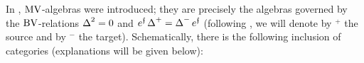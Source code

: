 \documentclass[\MainFolder/Text.tex]{subfiles}
\begin{document}
In \cite{Markl2015}, $\mathrm{MV}$-algebras were introduced; they are precisely the algebras governed by the $\mathrm{BV}$-relations $\operatorname{\Delta}^2 = 0$ and $e^{\mathfrak{f}} \operatorname{\Delta}^+ = \operatorname{\Delta}^- e^{\mathfrak{f}}$ (following \cite{Cieliebak2015}, we will denote by ${}^+$ the source and by ${}^-$ the target). Schematically, there is the following inclusion of categories (explanations will be given below):
\end{document}
